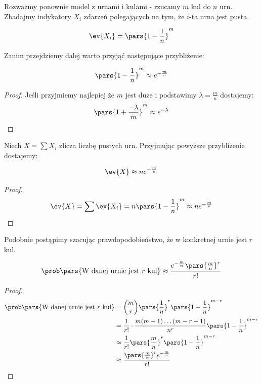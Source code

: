 Rozważmy ponownie model z urnami i kulami - rzucamy \(m\) kul do \(n\) urn.
Zbadajmy indykatory \(X_i\) zdarzeń polegających na tym, że \(i\)-ta urna jest pusta.

\begin{align*}
	\ev{X_i} = \pars{1 - \frac{1}{n}}^m
\end{align*}

Zanim przejdziemy dalej warto przyjąć następujące przybliżenie:

\begin{lemma}
	\begin{align*}
		\pars{1 - \frac{1}{n}}^m \approx e^{-\frac{m}{n}}
	\end{align*}
\end{lemma}
\begin{proof}
	Jeśli przyjmiemy najlepiej że \(m\) jest duże i podstawimy \(\lambda = \frac{m}{n}\) dostajemy:
	\begin{align*}
		\pars{1 + \frac{-\lambda}{m}}^m \approx e^{-\lambda}
	\end{align*}
\end{proof}

Niech \(X = \sum X_i\) zlicza liczbę pustych urn. Przyjmując powyższe przybliżenie dostajemy:

\begin{theorem}
	\begin{align*}
		\ev{X} \approx ne^{-\frac{m}{n}}
	\end{align*}
\end{theorem}
\begin{proof}
	\begin{align*}
		\ev{X} = \sum \ev{X_i} = n\pars{1 - \frac{1}{n}}^m \approx ne^{-\frac{m}{n}}
	\end{align*}
\end{proof}

Podobnie postąpimy szacując prawdopodobieństwo, że w konkretnej urnie jest \(r\) kul.

\begin{theorem}
	\begin{align*}
		\prob\pars{\text{W danej urnie jest \(r\) kul}} \approx \frac{e^{-\frac{m}{n}}\pars{\frac{m}{n}}^r}{r!}
	\end{align*}
\end{theorem}
\begin{proof}
	\begin{align*}
		\prob\pars{\text{W danej urnie jest \(r\) kul}} & = \binom{m}{r}\pars{\frac{1}{n}}^r\pars{1 - \frac{1}{n}}^{m-r}                     \\
		                                                & = \frac{1}{r!} \cdot \frac{m(m-1) \dots (m-r+1)}{n^r} \pars{1 - \frac{1}{n}}^{m-r} \\
		                                                & \approx \frac{1}{r!}\pars{\frac{m}{n}}^r\pars{1 - \frac{1}{n}}^{m-r}               \\
		                                                & \approx \frac{\pars{\frac{m}{n}}^r e^{-\frac{m}{n}}}{r!}
	\end{align*}
\end{proof}